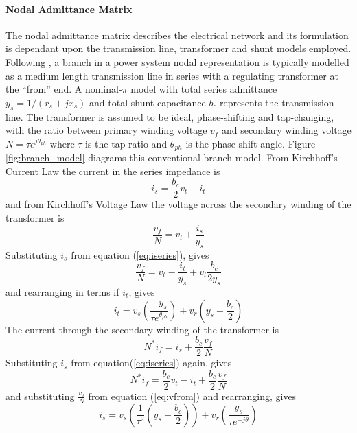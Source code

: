 \paragraph{Nodal Admittance Matrix}
The nodal admittance matrix describes the electrical network and its
formulation is dependant upon the transmission line, transformer and shunt
models employed.  Following , a branch in a power
system nodal representation is typically modelled as a medium length
transmission line in series with a regulating transformer at the ``from'' end.  A nominal-$\pi$ model with total series admittance $y_s = 1/(r_s+jx_s)$ and total shunt capacitance $b_c$ represents the transmission line.  The transformer is assumed to be ideal, phase-shifting and tap-changing, with the ratio between primary winding
voltage $v_{f}$ and secondary winding voltage $N = \tau e^{j\theta_{ph}}$
where $\tau$ is the tap ratio and $\theta_{ph}$ is the phase shift angle.
Figure \ref{fig:branch_model} diagrams this conventional branch model.  From
Kirchhoff's Current Law the current in the series impedance is
\begin{equation}
\label{eq:iseries}
i_s = \frac{b_c}{2}v_t - i_t
\end{equation}
and from Kirchhoff's Voltage Law the voltage across the secondary winding of
the transformer is
\begin{equation}
\frac{v_{f}}{N} = v_t + \frac{i_s}{y_s}
\end{equation}
Substituting $i_s$ from equation (\ref{eq:iseries}), gives
\begin{equation}
\label{eq:vfrom}
\frac{v_{f}}{N} = v_t - \frac{i_t}{y_s} + v_t\frac{b_c}{2y_s}
\end{equation}
and rearranging in terms if $i_t$, gives
\begin{equation}
\label{eq:ito}
i_t = v_s \left( \frac{-y_s}{\tau e^{\theta_{ph}}} \right) +
v_r \left( y_s + \frac{b_c}{2} \right)
\end{equation}
The current through the secondary winding of the transformer is
\begin{equation}
N^*i_f = i_s + \frac{b_c}{2}\frac{v_{f}}{N}
\end{equation}
Substituting $i_s$ from equation(\ref{eq:iseries}) again, gives
\begin{equation}
N^*i_f = \frac{b_c}{2}v_t - i_t + \frac{b_c}{2}\frac{v_{f}}{N}
\end{equation}
and substituting $\frac{v_{f}}{N}$ from equation (\ref{eq:vfrom}) and
rearranging, gives
\begin{equation}
\label{eq:ifrom}
i_s = v_s \left( \frac{1}{\tau^2} \left(y_s + \frac{b_c}{2}\right) \right) +
v_r \left(\frac{y_s}{\tau e^{-j\theta}}\right)
\end{equation}

